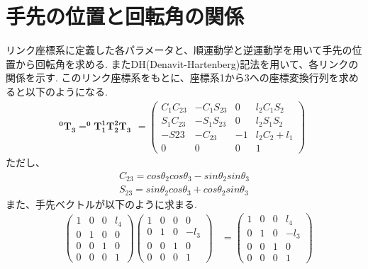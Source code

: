   \section{手先の位置と回転角の関係}
  	\label{chap:kinetic}
	リンク座標系に定義した各パラメータと、順運動学と逆運動学を用いて手先の位置から回転角を求める. またDH(Denavit-Hartenberg)記法を用いて、各リンクの関係を示す.
	このリンク座標系をもとに、座標系1から3への座標変換行列を求めると以下のようになる.
	\begin{equation}
		\boldsymbol{ ^{0}T_{3}=^{0}T_{1} ^{1}T_{2} ^{2}T_{3} }
		\begin{array}{cc}
			=
			\left(
				\begin{array}{cccc}
					C_1C_{23} & -C_1S_{23} & 0 & l_2C_1S_2 \\
					S_1C_{23} & -S_1S_{23} & 0 & l_2S_1S_2 \\
					-S{23} & -C_{23} & -1 & l_2C_2 + l_1 \\
					0 & 0 & 0 & 1
				\end{array}
			\right)
		\end{array}
	\end{equation}
	ただし、
	\begin{equation*}
		\begin{split}
			C_{23} = cos\theta_2cos\theta_3-sin\theta_2sin\theta_3\\
			S_{23} = sin\theta_2cos\theta_3+cos\theta_2sin\theta_3
		\end{split}
	\end{equation*}
    また、手先ベクトルが以下のように求まる.
	\begin{equation}
	\begin{array}{cccc}
		&\left(
			\begin{array}{cccc}
				1 & 0 & 0 & l_4\\
				0 & 1 & 0 & 0\\
				0 & 0 & 1 & 0\\
				0 & 0 & 0 & 1
			\end{array}
		\right)
		\left(
			\begin{array}{cccc}
				1 & 0 & 0 & 0\\
				0 & 1 & 0 & -l_3\\
				0 & 0 & 1 & 0\\
				0 & 0 & 0 & 1
			\end{array}
			\right)
		&=
		\left(
		\begin{array}{cccc}
			1 & 0 & 0 & l_4\\
			0 & 1 & 0 & -l_3\\
			0 & 0 & 1 & 0\\
			0 & 0 & 0 & 1
		\end{array}
		\right)
	\end{array}
	\end{equation}
